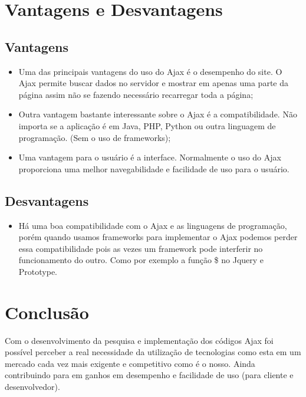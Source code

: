 \documentclass[12pt,a4paper]{article}
\begin{document}
\section{Vantagens e Desvantagens}
\subsection{Vantagens}

\begin{itemize}
\item Uma das principais vantagens do uso do Ajax é o desempenho do site. O Ajax permite buscar  dados no servidor e mostrar em apenas uma parte da página assim não se fazendo necessário recarregar toda a página;

\item Outra vantagem bastante interessante sobre o Ajax é a compatibilidade. Não importa se a aplicação é em Java, PHP, Python ou outra linguagem de programação. (Sem o uso de frameworks);

\item Uma vantagem para o usuário é a interface. Normalmente o uso do Ajax proporciona uma melhor navegabilidade e facilidade de uso para o usuário.


\end{itemize}

\subsection{Desvantagens}

\begin{itemize}
\item Há uma boa compatibilidade com o Ajax e as linguagens de programação, porém quando usamos frameworks para implementar o Ajax podemos perder essa compatibilidade pois as vezes um framework pode interferir no funcionamento do outro. Como por exemplo a função \$ no Jquery e Prototype.

\end{itemize}

\section{Conclusão}

Com o desenvolvimento da pesquisa e implementação dos códigos Ajax foi possível perceber a real necessidade da utilização de tecnologias como esta em um mercado cada vez mais exigente e competitivo como é o nosso. Ainda contribuindo para em ganhos em desempenho e facilidade de uso (para cliente e desenvolvedor).
\end{document}
